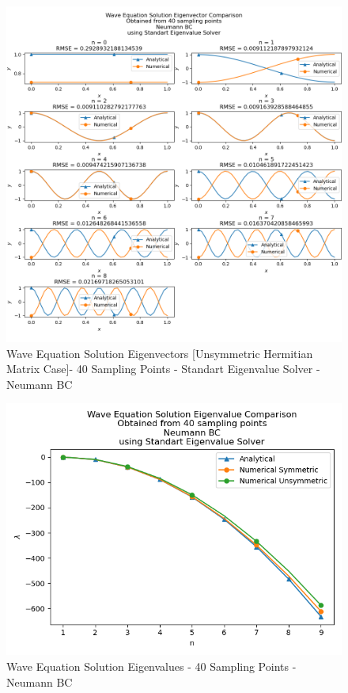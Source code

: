 \documentclass[letterpaper,12pt]{article}
\begin{document}
\begin{figure}[H]
\centerline{\includegraphics[width=\linewidth]{figures/5_40_Standart_Eigenvalue_Solver_n_eigenvector.png}}
\caption{Wave Equation Solution Eigenvectors [Unsymmetric Hermitian Matrix Case]- 40 Sampling Points - Standart Eigenvalue Solver - Neumann BC}
\label{fig:5_40_Standart_Eigenvalue_Solver_n_eigenvector}
\end{figure}

\begin{figure}[H]
\centerline{\includegraphics[width=\linewidth]{figures/5_40_Standart_Eigenvalue_Solver_n_eigenvalue.png}}
\caption{Wave Equation Solution Eigenvalues - 40 Sampling Points - Neumann BC}
\label{fig:5_40_Standart_Eigenvalue_Solver_n_eigenvalue}
\end{figure}
\end{document}
